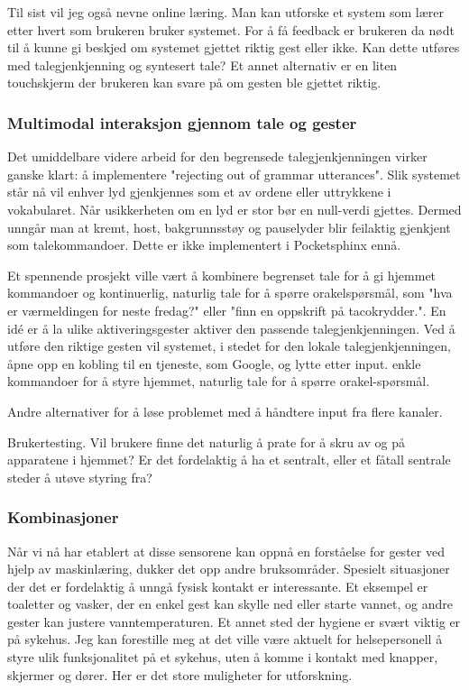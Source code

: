 Til sist vil jeg også nevne online læring. Man kan utforske et system som lærer etter hvert som brukeren bruker systemet. For å få feedback er brukeren da nødt til å kunne gi beskjed om systemet gjettet riktig gest eller ikke. Kan dette utføres med talegjenkjenning og syntesert tale? Et annet alternativ er en liten touchskjerm der brukeren kan svare på om gesten ble gjettet riktig.

\subsubsection*{Multimodal interaksjon gjennom tale og gester}
Det umiddelbare videre arbeid for den begrensede talegjenkjenningen virker ganske klart: å implementere "rejecting out of grammar utterances". Slik systemet står nå vil enhver lyd gjenkjennes som et av ordene eller uttrykkene i vokabularet. Når usikkerheten om en lyd er stor bør en null-verdi gjettes. Dermed unngår man at kremt, host, bakgrunnsstøy og pauselyder blir feilaktig gjenkjent som talekommandoer. Dette er ikke implementert i Pocketsphinx ennå.

Et spennende prosjekt ville vært å kombinere begrenset tale for å gi hjemmet kommandoer og kontinuerlig, naturlig tale for å spørre orakelspørsmål, som "hva er værmeldingen for neste fredag?" eller "finn en oppskrift på tacokrydder.". En idé er å la ulike aktiveringsgester aktiver den passende talegjenkjenningen. Ved å utføre den riktige gesten vil systemet, i stedet for den lokale talegjenkjenningen, åpne opp en kobling til en tjeneste, som Google, og lytte etter input.
enkle kommandoer for å styre hjemmet, naturlig tale for å spørre orakel-spørsmål.
 
Andre alternativer for å løse problemet med å håndtere input fra flere kanaler.

Brukertesting. Vil brukere finne det naturlig å prate for å skru av og på apparatene i hjemmet? Er det fordelaktig å ha et sentralt, eller et fåtall sentrale steder å utøve styring fra?

\subsubsection*{Kombinasjoner}
Når vi nå har etablert at disse sensorene kan oppnå en forståelse for gester ved hjelp av maskinlæring, dukker det opp andre bruksområder. Spesielt situasjoner der det er fordelaktig å unngå fysisk kontakt er interessante. Et eksempel er toaletter og vasker, der en enkel gest kan skylle ned eller starte vannet, og andre gester kan justere vanntemperaturen. Et annet sted der hygiene er svært viktig er på sykehus. Jeg kan forestille meg at det ville være aktuelt for helsepersonell å styre ulik funksjonalitet på et sykehus, uten å komme i kontakt med knapper, skjermer og dører. Her er det store muligheter for utforskning.

